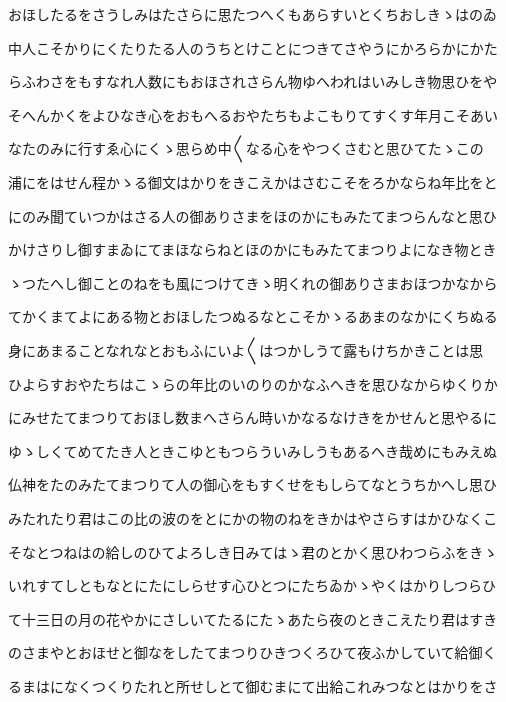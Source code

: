 \documentclass[a4paper,11pt,landscape]{ltjtarticle}
\begin{document}
おほしたるをさうしみはたさらに思たつへくもあらすいとくちおしきゝはのゐ
\par\medskip
中人こそかりにくたりたる人のうちとけことにつきてさやうにかろらかにかた
\par\medskip
らふわさをもすなれ人数にもおほされさらん物ゆへわれはいみしき物思ひをや
\par\medskip
そへんかくをよひなき心をおもへるおやたちもよこもりてすくす年月こそあい
\par\medskip
なたのみに行すゑ心にくゝ思らめ中〱なる心をやつくさむと思ひてたゝこの
\par\medskip
浦にをはせん程かゝる御文はかりをきこえかはさむこそをろかならね年比をと
\par\medskip
にのみ聞ていつかはさる人の御ありさまをほのかにもみたてまつらんなと思ひ
\par\medskip
かけさりし御すまゐにてまほならねとほのかにもみたてまつりよになき物とき
\par\medskip
ゝつたへし御ことのねをも風につけてきゝ明くれの御ありさまおほつかなから
\par\medskip
てかくまてよにある物とおほしたつぬるなとこそかゝるあまのなかにくちぬる
\par\medskip
身にあまることなれなとおもふにいよ〱はつかしうて露もけちかきことは思
\par\medskip
ひよらすおやたちはこゝらの年比のいのりのかなふへきを思ひなからゆくりか
\par\medskip
にみせたてまつりておほし数まへさらん時いかなるなけきをかせんと思やるに
\par\medskip
ゆゝしくてめてたき人ときこゆともつらういみしうもあるへき哉めにもみえぬ
\par\medskip
仏神をたのみたてまつりて人の御心をもすくせをもしらてなとうちかへし思ひ
\par\medskip
みたれたり君はこの比の波のをとにかの物のねをきかはやさらすはかひなくこ
\par\medskip
そなとつねはの給しのひてよろしき日みてはゝ君のとかく思ひわつらふをきゝ
\par\medskip
いれすてしともなとにたにしらせす心ひとつにたちゐかゝやくはかりしつらひ
\par\medskip
て十三日の月の花やかにさしいてたるにたゝあたら夜のときこえたり君はすき
\par\medskip
のさまやとおほせと御なをしたてまつりひきつくろひて夜ふかしていて給御く
\par\medskip
るまはになくつくりたれと所せしとて御むまにて出給これみつなとはかりをさ
\par\medskip
\end{document}
